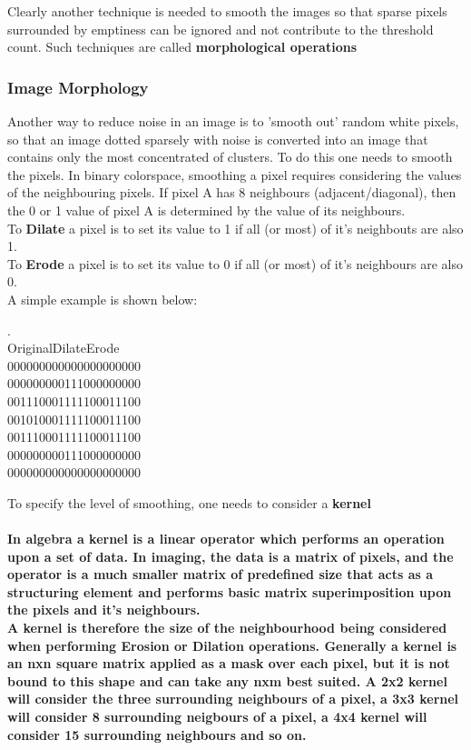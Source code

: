 \documentclass[11pt]{article} %
\newcommand{\tab}{\hspace*{2em}}
\begin{document}
Clearly another technique is needed to smooth the images so that sparse pixels surrounded by emptiness can be ignored and not contribute to the threshold count. Such techniques are called {\bf morphological operations}

\subsubsection{Image Morphology}
Another way to reduce noise in an image is to 'smooth out' random white pixels, so that an image dotted sparsely with noise is converted into an image that contains only the most concentrated of clusters.  To do this one needs to smooth the pixels.
In binary colorspace, smoothing a pixel requires considering the values of the neighbouring pixels. If pixel A has 8 neighbours (adjacent/diagonal), then the 0 or 1 value of pixel A is determined by the value of its neighbours.\\
To {\bf Dilate} a pixel is to set its value to 1 if all (or most) of it's neighbouts are also 1.\\
To {\bf Erode} a pixel is to set its value to 0 if all (or most) of it's neighbours are also 0.\\
A simple example is shown below:
\begin{center}
\begin{frame}
.\\
Original\tab	Dilate\tab	Erode\tab\\
\tiny{
0000000\tab	0000000\tab	0000000\\
0000000\tab	0011100\tab	0000000\\
0011100\tab	0111110\tab	0011100\\
0010100\tab	0111110\tab	0011100\\
0011100\tab	0111110\tab	0011100\\
0000000\tab	0011100\tab	0000000\\
0000000\tab	0000000\tab	0000000\\
}
\end{frame}
\end{center}

To specify the level of smoothing, one needs to consider a {\bf kernel}
\paragraph{In algebra a kernel is a linear operator which performs an operation upon a set of data. In imaging, the data is a matrix of pixels, and the operator is a much smaller matrix of predefined size that acts as a structuring element and performs basic matrix superimposition upon the pixels and it's neighbours. \\
A kernel is therefore the size of the neighbourhood being considered when performing Erosion or Dilation operations. Generally a kernel is an nxn square matrix applied as a mask over each pixel, but it is not bound to this shape and can take any nxm best suited.
A 2x2 kernel will consider the three surrounding neighbours of a pixel, a 3x3 kernel will consider 8 surrounding neigbours of a pixel, a 4x4 kernel will consider 15 surrounding neighbours and so on.
}
\end{document}
